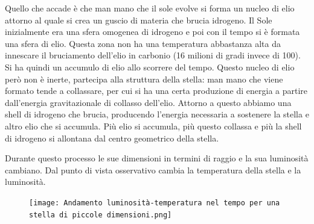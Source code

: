 
Quello che accade è che man mano che il sole evolve si forma un nucleo di elio attorno al quale si crea un guscio di materia che brucia idrogeno. Il Sole inizialmente era una sfera omogenea di idrogeno e poi con il tempo si è formata una sfera di elio. Questa zona non ha una temperatura abbastanza alta da innescare il bruciamento dell'elio in carbonio (16 milioni di gradi invece di 100). Si ha quindi un accumulo di elio allo scorrere del tempo. Questo nucleo di elio però non è inerte, partecipa alla struttura della stella: man mano che viene formato tende a collassare, per cui si ha una certa produzione di energia a partire dall'energia gravitazionale di collasso dell'elio. Attorno a questo abbiamo una shell di idrogeno che brucia, producendo l'energia necessaria a sostenere la stella e altro elio che si accumula. Più elio si accumula, più questo collassa e più la shell di idrogeno si allontana dal centro geometrico della stella.

Durante questo processo le sue dimensioni in termini di raggio e la sua luminosità cambiano. Dal punto di vista osservativo cambia la temperatura della stella e la luminosità. 

\begin{figure}[H]
    \centering
    \texttt{[image: Andamento luminosità-temperatura nel tempo per una stella di piccole dimensioni.png]}
    \label{fig:Andamento luminosità-temperatura nel tempo per una stella di piccole dimensioni}
\end{figure}

